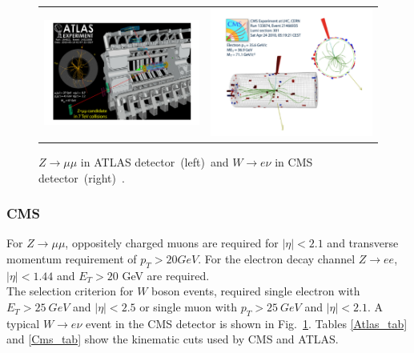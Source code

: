 \begin{figure}[H]
\begin{tabular}{cc}

\includegraphics[scale=0.5]{chapter3/atlas.png}
&
\includegraphics[scale=0.5]{chapter3/cms-w.png}
\end{tabular}
\caption{$Z\rightarrow \mu\mu$ in ATLAS detector~(left)~and $W\rightarrow e\nu$ in CMS detector~(right)~\cite{Schott_2014}.}
\label{ATLAS_sel}
\label{W-event}
\end{figure}
 
\subsubsection{CMS}
For $Z\rightarrow \mu\mu$, oppositely charged muons are required for $|\eta|<2.1$ and transverse momentum requirement of $p_{T}>20GeV$. For the electron decay channel $Z\rightarrow ee$, $|\eta|<1.44$ and $E_{T}>20$ GeV are required.\\
The selection criterion for $W$ boson events, required single electron with $E_{T}>25~GeV$ and $|\eta|<2.5$ or single muon with $p_{T}>25~GeV$ and $|\eta|<2.1$. A typical $W\rightarrow e\nu$ event in the CMS detector is shown in Fig.~\ref{W-event}. Tables \ref{Atlas_tab} and \ref{Cms_tab} show the kinematic cuts used by CMS and ATLAS.

